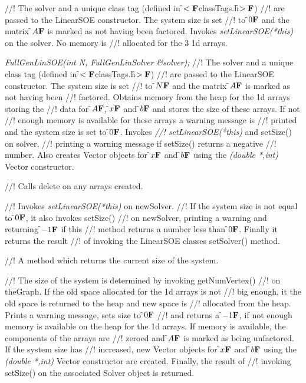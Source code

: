 //! The \p solver and a unique class tag (defined in \f$<{\bf F}$classTags.h\f$>{\bf F}$)
//! are passed to the LinearSOE constructor. The system size is set
//! to \f$0{\bf F}$ and the matrix \f$A{\bf F}$ is marked as not having been factored. Invokes
{\em setLinearSOE(*this)} on the \p solver. No memory is
//! allocated for the 3 1d arrays.  


{\em FullGenLinSOE(int N, FullGenLinSolver \&solver); }
//! The \p solver and a unique class tag (defined in \f$<{\bf F}$classTags.h\f$>{\bf F}$)
//! are passed to the LinearSOE constructor. The system size is set
//! to \f$N{\bf F}$ and the matrix \f$A{\bf F}$ is marked as not having been
//! factored. Obtains memory from the heap for the 1d arrays storing the
//! data for \f$A{\bf F}$, \f$x{\bf F}$ and \f$b{\bf F}$ and stores the size of these arrays. If not
//! enough memory is available for these arrays a warning message is
//! printed and the system size is set to \f$0{\bf F}$. Invokes {\em
//! setLinearSOE(*this)} and setSize() on \p solver,
//! printing a warning message if setSize() returns a negative
//! number. Also creates Vector objects for \f$x{\bf F}$ and \f$b{\bf F}$ using the {\em
(double *,int)} Vector constructor.

//! Calls delete on any arrays created.

//! Invokes {\em setLinearSOE(*this)} on \p newSolver.
//! If the system size is not equal to \f$0{\bf F}$, it also invokes setSize()
//! on \p newSolver, printing a warning and returning \f$-1{\bf F}$ if this
//! method returns a number less than \f$0{\bf F}$. Finally it returns the result
//! of invoking the LinearSOE classes setSolver() method.

//! A method which returns the current size of the system.

//! The size of the system is determined by invoking getNumVertex()
//! on \p theGraph. If the old space allocated for the 1d arrays is not
//! big enough, it the old space is returned to the heap and new space is
//! allocated from the heap. Prints a warning message, sets size to \f$0{\bf F}$
//! and returns a \f$-1{\bf F}$, if not enough memory is available on the heap for the 
1d arrays. If memory is available, the components of the arrays are
//! zeroed and \f$A{\bf F}$ is marked as being unfactored. If the system size has
//! increased, new Vector objects for \f$x{\bf F}$ and \f$b{\bf F}$ using the {\em (double
*,int)} Vector constructor are created. Finally, the result of
//! invoking setSize() on the associated Solver object is returned.


